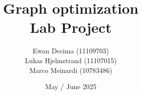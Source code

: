 \documentclass[10pt]{article}
\begin{document}
	\title{Graph optimization \\ Lab Project}
	\author{
		Ewan Decima (11109703)  \\
		Lukas Hjelmstrand (11107015)  \\
		Marco Meinardi (10783486)
	}
	\date{May / June 2025}

	\maketitle

	\tableofcontents
	\newpage

	
	\newpage

	
	\newpage

	
	\newpage

	
	\newpage

	
	\newpage

	
	\newpage
\end{document}
